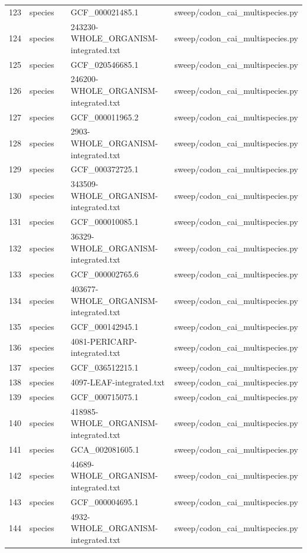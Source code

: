 {\begin{longtable}{rllp{3.2cm}p{4.2cm}}
123 & species &  & GCF\_000021485.1 & sweep/codon\_cai\_multispecies.py\\
124 & species &  & 243230-WHOLE\_ORGANISM-integrated.txt & sweep/codon\_cai\_multispecies.py\\
125 & species &  & GCF\_020546685.1 & sweep/codon\_cai\_multispecies.py\\
126 & species &  & 246200-WHOLE\_ORGANISM-integrated.txt & sweep/codon\_cai\_multispecies.py\\
127 & species &  & GCF\_000011965.2 & sweep/codon\_cai\_multispecies.py\\
128 & species &  & 2903-WHOLE\_ORGANISM-integrated.txt & sweep/codon\_cai\_multispecies.py\\
129 & species &  & GCF\_000372725.1 & sweep/codon\_cai\_multispecies.py\\
130 & species &  & 343509-WHOLE\_ORGANISM-integrated.txt & sweep/codon\_cai\_multispecies.py\\
131 & species &  & GCF\_000010085.1 & sweep/codon\_cai\_multispecies.py\\
132 & species &  & 36329-WHOLE\_ORGANISM-integrated.txt & sweep/codon\_cai\_multispecies.py\\
133 & species &  & GCF\_000002765.6 & sweep/codon\_cai\_multispecies.py\\
134 & species &  & 403677-WHOLE\_ORGANISM-integrated.txt & sweep/codon\_cai\_multispecies.py\\
135 & species &  & GCF\_000142945.1 & sweep/codon\_cai\_multispecies.py\\
136 & species &  & 4081-PERICARP-integrated.txt & sweep/codon\_cai\_multispecies.py\\
137 & species &  & GCF\_036512215.1 & sweep/codon\_cai\_multispecies.py\\
138 & species &  & 4097-LEAF-integrated.txt & sweep/codon\_cai\_multispecies.py\\
139 & species &  & GCF\_000715075.1 & sweep/codon\_cai\_multispecies.py\\
140 & species &  & 418985-WHOLE\_ORGANISM-integrated.txt & sweep/codon\_cai\_multispecies.py\\
141 & species &  & GCA\_002081605.1 & sweep/codon\_cai\_multispecies.py\\
142 & species &  & 44689-WHOLE\_ORGANISM-integrated.txt & sweep/codon\_cai\_multispecies.py\\
143 & species &  & GCF\_000004695.1 & sweep/codon\_cai\_multispecies.py\\
144 & species &  & 4932-WHOLE\_ORGANISM-integrated.txt & sweep/codon\_cai\_multispecies.py\\

\end{longtable}}
